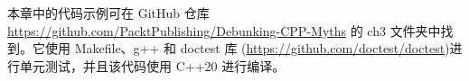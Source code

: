 本章中的代码示例可在 GitHub 仓库 \url{https://github.com/PacktPublishing/Debunking-CPP-Myths} 的 ch3 文件夹中找到。它使用 Makefile、g++ 和 doctest 库 (\url{https://github.com/doctest/doctest})进行单元测试，并且该代码使用 C++20 进行编译。

